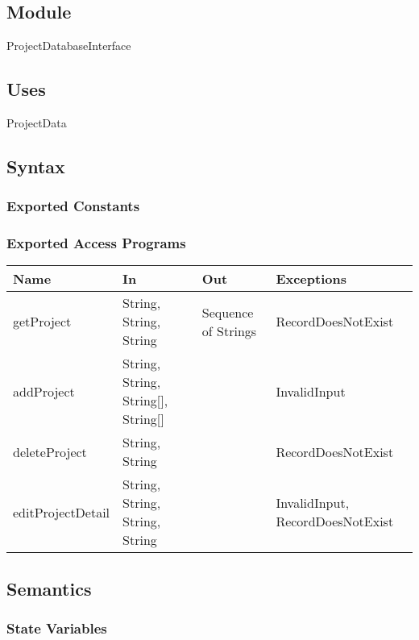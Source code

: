 \documentclass[12pt, titlepage]{article}
\begin{document}
	\subsection{Module}
	
	ProjectDatabaseInterface
	
	\subsection{Uses}
	ProjectData
	
	\subsection{Syntax}
	
	\subsubsection{Exported Constants}
	
	\subsubsection{Exported Access Programs}
	
	\footnotesize\begin{center}
		\begin{tabular}{l l l l}
			\hline
			\textbf{Name} & \textbf{In} & \textbf{Out} & \textbf{Exceptions} \\
			\hline
			getProject & String, String, String & Sequence of Strings & RecordDoesNotExist \\
			\hline
			addProject & String, String, String[], String[] & & InvalidInput \\
			\hline
			deleteProject & String, String & & RecordDoesNotExist \\
			\hline
			editProjectDetail & String, String, String, String & &InvalidInput, RecordDoesNotExist \\
			\hline
		\end{tabular}
	\end{center}
	\normalsize
	
	\subsection{Semantics}
	
	\subsubsection{State Variables}
	
\end{document}
